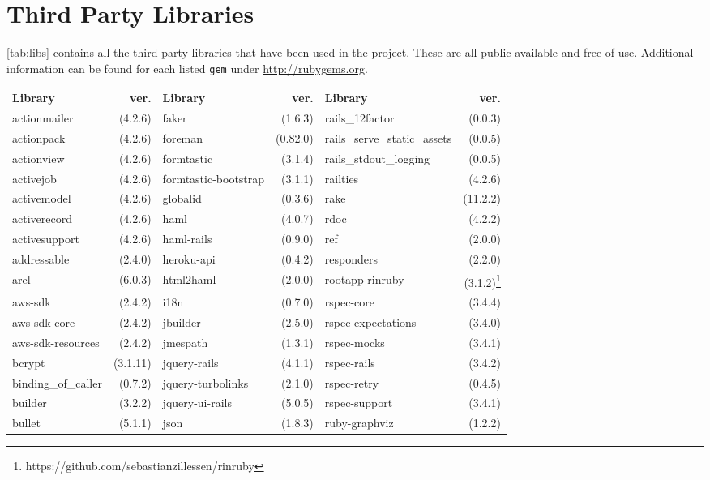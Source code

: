 {}

\section{Third Party Libraries}
\label{app:c}
\label{app:3rdparty}
\autoref{tab:libs} contains all the third party libraries that have been used in the project. These are all public available and free of use. Additional information can be found for each listed \texttt{gem} under \href{http://rubygems.org}{http://rubygems.org}.

\begin{table}[!h]
	\centering
	\begin{tabular}{|p{2.4cm}r||p{2.4cm}r||p{2.4cm}r|}
	\hline
	\textbf{Library} & \textbf{ver.} & 	\textbf{Library} & \textbf{ver.} & 	\textbf{Library} & \textbf{ver.} \\
	actionmailer&(4.2.6)&faker&(1.6.3)&rails\_12factor&(0.0.3)\\
actionpack&(4.2.6)&foreman&(0.82.0)&\tiny{rails\_serve\_static\_assets}&(0.0.5)\\
actionview&(4.2.6)&formtastic&(3.1.4)&\tiny{rails\_stdout\_logging}&(0.0.5)\\
activejob&(4.2.6)&\tiny{formtastic-bootstrap}&(3.1.1)&railties&(4.2.6)\\
activemodel&(4.2.6)&globalid&(0.3.6)&rake&(11.2.2)\\
activerecord&(4.2.6)&haml&(4.0.7)&rdoc&(4.2.2)\\
activesupport&(4.2.6)&haml-rails&(0.9.0)&ref&(2.0.0)\\
addressable&(2.4.0)&heroku-api&(0.4.2)&responders&(2.2.0)\\
arel&(6.0.3)&html2haml&(2.0.0)&\tiny{rootapp-rinruby}&(3.1.2)\footnote{https://github.com/sebastianzillessen/rinruby}\\
aws-sdk&(2.4.2)&i18n&(0.7.0)&rspec-core&(3.4.4)\\
aws-sdk-core&(2.4.2)&jbuilder&(2.5.0)&\tiny{rspec-expectations}&(3.4.0)\\
\tiny{aws-sdk-resources}&(2.4.2)&jmespath&(1.3.1)&rspec-mocks&(3.4.1)\\
bcrypt&(3.1.11)&jquery-rails&(4.1.1)&rspec-rails&(3.4.2)\\
\tiny{binding\_of\_caller}&(0.7.2)&\tiny{jquery-turbolinks}&(2.1.0)&rspec-retry&(0.4.5)\\
builder&(3.2.2)&jquery-ui-rails&(5.0.5)&rspec-support&(3.4.1)\\
bullet&(5.1.1)&json&(1.8.3)&ruby-graphviz&(1.2.2)\\

\end{tabular}
\end{table}
